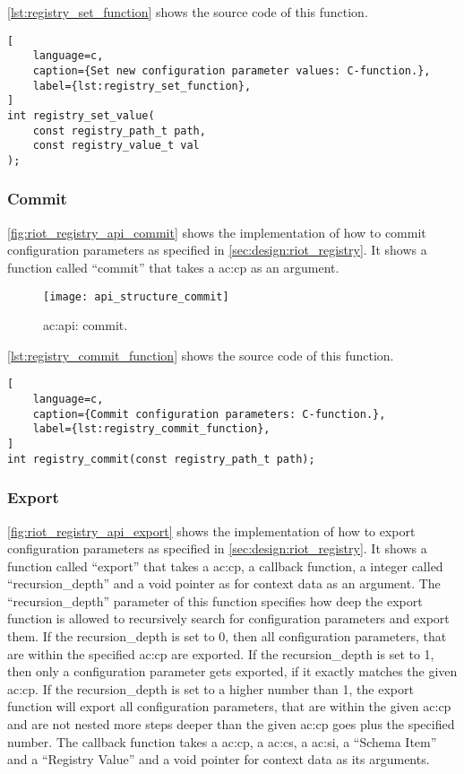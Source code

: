{\autoref{lst:registry_set_function} shows the source code of this function.

\begin{lstlisting}[
    language=c,
    caption={Set new configuration parameter values: C-function.},
    label={lst:registry_set_function},
]
int registry_set_value(
    const registry_path_t path,
    const registry_value_t val
);
\end{lstlisting}

\subsubsection{Commit}

\autoref{fig:riot_registry_api_commit} shows the implementation of how to commit configuration parameters as specified in \autoref{sec:design:riot_registry}.
It shows a function called ``commit'' that takes a \gls{ac:cp} as an argument.

\begin{figure}[H]
    \centering
    \texttt{[image: api\_structure\_commit]}
    \caption{ \gls{ac:api}: commit.}
    \label{fig:riot_registry_api_commit}
\end{figure}

\autoref{lst:registry_commit_function} shows the source code of this function.

\begin{lstlisting}[
    language=c,
    caption={Commit configuration parameters: C-function.},
    label={lst:registry_commit_function},
]
int registry_commit(const registry_path_t path);
\end{lstlisting}

\subsubsection{Export}

\autoref{fig:riot_registry_api_export} shows the implementation of how to export configuration parameters as specified in \autoref{sec:design:riot_registry}.
It shows a function called ``export'' that takes a \gls{ac:cp}, a callback function, a integer called ``recursion\_depth'' and a void pointer as for context data as an argument.
The ``recursion\_depth'' parameter of this function specifies how deep the export function is allowed to recursively search for configuration parameters and export them.
If the recursion\_depth is set to 0, then all configuration parameters, that are within the specified \gls{ac:cp} are exported.
If the recursion\_depth is set to 1, then only a configuration parameter gets exported, if it exactly matches the given \gls{ac:cp}.
If the recursion\_depth is set to a higher number than 1, the export function will export all configuration parameters, that are within the given \gls{ac:cp} and are not nested more steps deeper than the given \gls{ac:cp} goes plus the specified number.
The callback function takes a \gls{ac:cp}, a \gls{ac:cs}, a \gls{ac:si}, a ``Schema Item'' and a ``Registry Value'' and a void pointer for context data as its arguments.

}
